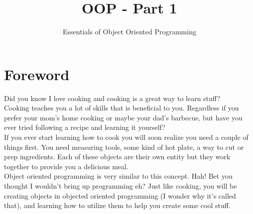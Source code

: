 \documentclass{42-en}
\begin{document}
                           \title{OOP - Part 1}
                          \subtitle{Essentials of Object Oriented Programming}

\maketitle

\tableofcontents

\chapter{Foreword}

	Did you know I love cooking and cooking is a great way to learn stuff?\\

	Cooking teaches you a lot of skills that is beneficial to you. Regardless
	if you prefer your mom's home cooking or maybe your dad's barbecue, but
	have you ever tried following a recipe and learning it yourself?\\

	If you ever start learning how to cook you will soon realize you need a
	couple of things first. You need measuring tools, some kind of hot plate,
	a way to cut or prep ingredients. Each of these objects are their own
	entity but they work together to provide you a delicious meal.\\

	Object oriented programming is very similar to this concept. Hah! Bet you
	thought I wouldn't bring up programming eh? Just like cooking, you will
	be creating objects in objected oriented programming (I wonder why it's called
	that), and learning how to utilize them to help you create some cool stuff.\\
\end{document}
